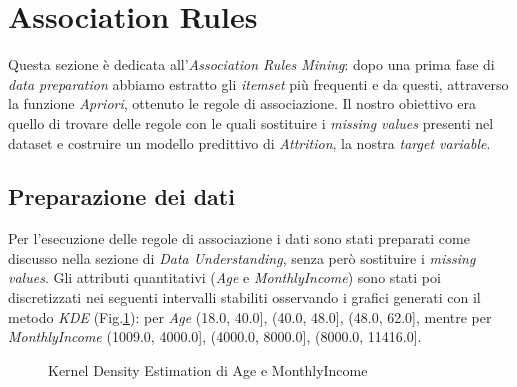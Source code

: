 \section{Association Rules}
Questa sezione è dedicata all'\textit{Association Rules Mining}: dopo una prima fase di \textit{data preparation} abbiamo estratto gli \textit{itemset} più frequenti e da questi, attraverso la funzione \textit{Apriori}, ottenuto le regole di associazione. Il nostro obiettivo era quello di trovare delle regole con le quali sostituire i \textit{missing values} presenti nel dataset e costruire un modello predittivo di \textit{Attrition}, la nostra \textit{target variable}.

\subsection{Preparazione dei dati}
Per l'esecuzione delle regole di associazione i dati sono stati preparati come discusso nella sezione di \textit{Data Understanding}, senza però sostituire i \textit{missing values}. Gli attributi quantitativi (\textit{Age} e \textit{MonthlyIncome}) sono stati poi discretizzati nei seguenti intervalli stabiliti osservando i grafici generati con il metodo \textit{KDE} (Fig.\ref{AR}): per \textit{Age} (18.0, 40.0], (40.0, 48.0], (48.0, 62.0], mentre per \textit{MonthlyIncome} (1009.0, 4000.0], (4000.0, 8000.0], (8000.0, 11416.0].
\begin{figure}[H]
	\centering
	\quad
	\caption{Kernel Density Estimation di Age e MonthlyIncome}
	\label{AR}
\end{figure}
